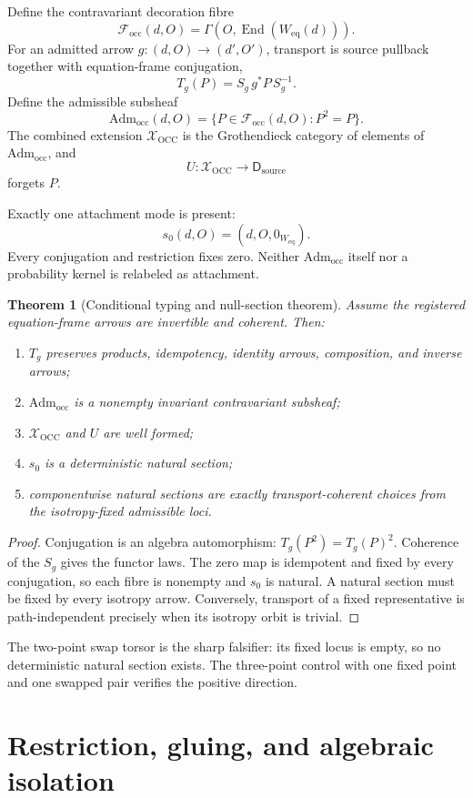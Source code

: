 \documentclass[11pt]{article}
\newtheorem{theorem}{Theorem}
\newcommand{\Focc}{\mathcal F_{\mathrm{occ}}}
\newcommand{\Adm}{\mathrm{Adm}_{\mathrm{occ}}}
\newcommand{\Xocc}{\mathcal X_{\mathrm{OCC}}}
\newcommand{\Weq}{W_{\mathrm{eq}}}
\begin{document}
Define the contravariant decoration fibre
\[
 \Focc(d,O)=\Gamma\!\left(O,\operatorname{End}(\Weq(d))\right).
\]
For an admitted arrow $g:(d,O)\to(d',O')$, transport is source pullback
together with equation-frame conjugation,
\[
 T_g(P)=S_g\,g^*P\,S_g^{-1}.
\]
Define the admissible subsheaf
\[
 \Adm(d,O)=\{P\in\Focc(d,O):P^2=P\}.
\]
The combined extension $\Xocc$ is the Grothendieck category of elements of
$\Adm$, and
\[
 U:\Xocc\longrightarrow\mathsf D_{\mathrm{source}}
\]
forgets $P$.

Exactly one attachment mode is present:
\[
 s_0(d,O)=(d,O,0_{\Weq}).
\]
Every conjugation and restriction fixes zero. Neither $\Adm$ itself nor a
probability kernel is relabeled as attachment.

\begin{theorem}[Conditional typing and null-section theorem]
Assume the registered equation-frame arrows are invertible and coherent.
Then:
\begin{enumerate}
\setlength{\itemsep}{0.15em}
\setlength{\parskip}{0pt}
\item $T_g$ preserves products, idempotency, identity arrows, composition,
and inverse arrows;
\item $\Adm$ is a nonempty invariant contravariant subsheaf;
\item $\Xocc$ and $U$ are well formed;
\item $s_0$ is a deterministic natural section;
\item componentwise natural sections are exactly transport-coherent choices
from the isotropy-fixed admissible loci.
\end{enumerate}
\end{theorem}

\begin{proof}
Conjugation is an algebra automorphism:
$T_g(P^2)=T_g(P)^2$. Coherence of the $S_g$ gives the functor laws.
The zero map is idempotent and fixed by every conjugation, so each fibre is
nonempty and $s_0$ is natural. A natural section must be fixed by every
isotropy arrow. Conversely, transport of a fixed representative is
path-independent precisely when its isotropy orbit is trivial.
\end{proof}

The two-point swap torsor is the sharp falsifier: its fixed locus is empty, so
no deterministic natural section exists. The three-point control with one
fixed point and one swapped pair verifies the positive direction.

\section{Restriction, gluing, and algebraic isolation}
\end{document}
